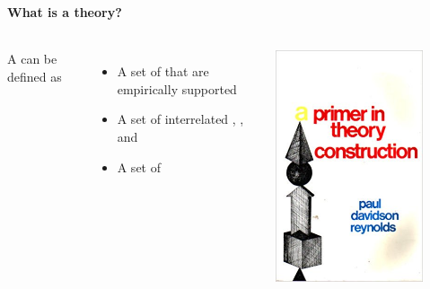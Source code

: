 \documentclass[8pt]{beamer}
\begin{document}
\begin{frame}
\frametitle{\insertsection}
\framesubtitle{What is a theory?}


\begin{columns}[c]
A {\color{blue}{theory}} can be defined as

\begin{itemize}
\item A set of {\color{blue}{laws}} that are empirically supported
\item A set of interrelated {\color{blue}{definitions}}, {\color{blue}{axioms}}, and {\color{blue}{propositions}}
\item A set of {\color{blue}{descriptions of casual processes}}
\end{itemize}


\centering
\includegraphics[width=0.8\textwidth, frame]{theory}\\
{\tiny\cite{Reynolds1971}}

\end{columns}

\end{frame}
\end{document}
